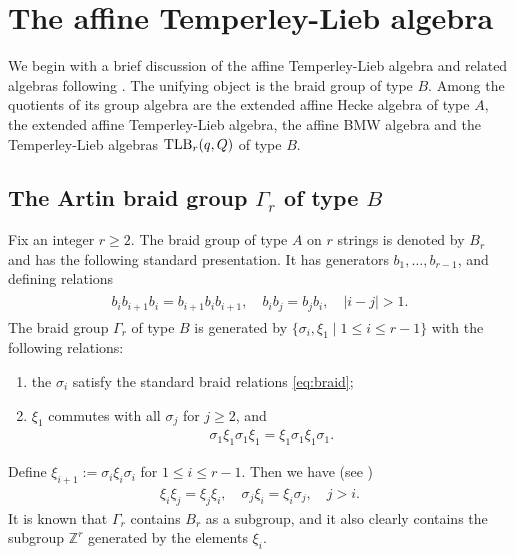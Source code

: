 \documentclass[12pt]{amsart}
\theoremstyle{definition}
\theoremstyle{remark}
\numberwithin{equation}{section}
\newcommand{\Z}{{\mathbb Z}}
\newcommand{\TLB}{{\rm{TLB}}}
\begin{document}
\section{The affine Temperley-Lieb algebra}\label{sect:ATL-algebra}

We begin with a brief discussion of the affine Temperley-Lieb algebra and related algebras following \cite{GL98, GL03}.  
The unifying object is the braid group of type $B$. 
 Among the quotients of its group algebra are the extended affine Hecke algebra of type $A$, the extended affine Temperley-Lieb algebra, the affine BMW algebra
 and the Temperley-Lieb algebras $\TLB_r(q,Q)$ of type $B$. 



%
%
\subsection{The Artin braid group $\Gamma_r$ of type $B$}
%
%

Fix an integer $r\ge 2$. 
The braid group  of type $A$  on $r$ strings is denoted by $B_r$ and  has the following standard presentation. 
It has generators $b_1, \dots, b_{r-1}$, and defining relations 
\begin{eqnarray}\label{eq:braid}
\begin{aligned}
b_i b_{i+1} b_i = b_{i+1} b_i b_{i+1}, \quad b_i b_j = b_j b_i, \quad |i-j|>1.
\end{aligned}
\end{eqnarray}
The braid group $\Gamma_r$ of type $B$ \cite{GL03} is generated by $\{\sigma_i,  \xi_1\mid 1\le i\le r-1\}$ with the following relations:  
\begin{enumerate}
\item 
the $\sigma_i$ satisfy 
the standard braid relations \eqref{eq:braid};   
\item $\xi_1$ commutes with all $\sigma_j$ for $j\ge 2$, and 
\begin{eqnarray}\label{eq:sigma-xi}
\sigma_1 \xi_1 \sigma_1 \xi_1 = \xi_1 \sigma_1 \xi_1\sigma_1. 
\end{eqnarray}
\end{enumerate}
Define $\xi_{i+1} := \sigma_i \xi_i \sigma_i$ for $1\le i\le r-1$. 
Then we have  (see \cite[Prop. (2.6)]{GL03})
\[
\begin{aligned}
\xi_i \xi_j=\xi_j\xi_i, \quad \sigma_j \xi_i = \xi_i \sigma_j, \quad j>i. 
\end{aligned}
\]
It is known that $\Gamma_r$ contains $B_r$ as a subgroup, and it also clearly contains the subgroup $\Z^r$ generated by the elements $\xi_i$. 
\end{document}

